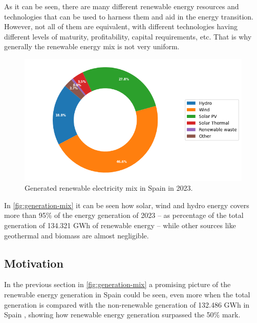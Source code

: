 As it can be seen, there are many different renewable energy resources and technologies that can be used to harness them and aid in the energy transition. However, not all of them are equivalent, with different technologies having different levels of maturity, profitability, capital requirements, etc. That is why generally the renewable energy mix is not very uniform. 

\begin{figure}[ht]
    \centering
    \captionsetup{justification=centering}
    \includegraphics[width=0.7\linewidth]{assets/generation-mix.png}
    \caption{Generated renewable electricity mix in Spain in 2023. \cite{renewable_generation_reports_2023}}
    \label{fig:generation-mix}
\end{figure}

In \autoref{fig:generation-mix} it can be seen how solar, wind and hydro energy covers more than 95\% of the energy generation of 2023 -- as percentage of the total generation of 134.321 GWh of renewable energy -- while other sources like geothermal and biomass are almost negligible. 

\subsection{Motivation}
\label{sec:motivation}

In the previous section in \autoref{fig:generation-mix} a promising picture of the renewable energy generation in Spain could be seen, even more when the total generation is compared with the non-renewable generation of 132.486 GWh in Spain \cite{renewable_generation_reports_2023}, showing how renewable energy generation surpassed the 50\% mark.

